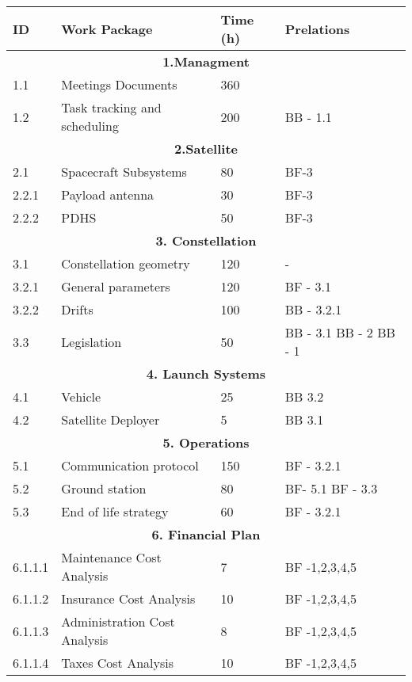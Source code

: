 \begin{longtable}{ | p{1.3cm} | p{7cm} | p{3cm} | p{3.5cm} |}
\hline

\textbf{ID }& \textbf{Work Package} & \textbf{Time (h)} & \textbf{Prelations} \\ \hline
\multicolumn{4}{|c|}{\textbf{1.Managment}} \\ \hline
1.1 & Meetings Documents & 360 &   \\ \hline
1.2 & Task tracking and scheduling & 200 & BB - 1.1 \\ \hline
\multicolumn{4}{|c|}{\textbf{2.Satellite}} \\ \hline
2.1 & Spacecraft Subsystems & 80 & BF-3 \\ \hline
2.2.1 & Payload antenna & 30 & BF-3 \\ \hline
2.2.2 & PDHS & 50 & BF-3 \\ \hline
\multicolumn{4}{|c|}{\textbf{3. Constellation}} \\ \hline
3.1 & Constellation geometry & 120 & - \\ \hline
3.2.1 & General parameters & 120 & BF - 3.1 \\ \hline
3.2.2 & Drifts & 100 & BB - 3.2.1 \\ \hline
3.3 & Legislation & 50 & BB - 3.1 \newline
BB - 2 \newline 
BB - 1 \\ \hline
\multicolumn{4}{|c|}{\textbf{4. Launch Systems}} \\ \hline
4.1 & Vehicle & 25 & BB 3.2 \\ \hline
4.2 & Satellite Deployer & 5 & BB 3.1  \\ \hline
\multicolumn{4}{|c|}{\textbf{5. Operations}} \\ \hline
5.1 & Communication protocol & 150 & BF - 3.2.1 \\ \hline
5.2 & Ground station & 80 & BF- 5.1 \newline BF - 3.3 \\ \hline
5.3 & End of life strategy & 60 & BF - 3.2.1 \\
\hline
\multicolumn{4}{|c|}{\textbf{6. Financial Plan}} \\ \hline
6.1.1.1 & Maintenance Cost Analysis & 7 & BF -1,2,3,4,5 \\ \hline
6.1.1.2 & Insurance Cost Analysis & 10 & BF -1,2,3,4,5  \\ \hline
6.1.1.3 & Administration Cost Analysis & 8 & BF -1,2,3,4,5 \\ \hline
6.1.1.4 & Taxes Cost Analysis  & 10 & BF -1,2,3,4,5  \\ \hline

\end{longtable}
